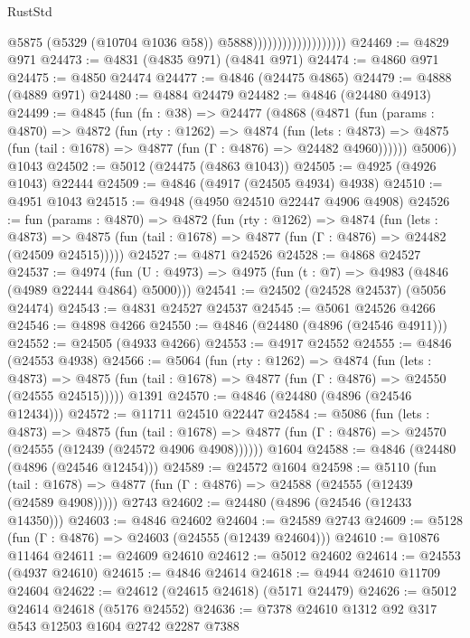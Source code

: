 \begin{lexlean}{RustStd}
\begin{coremodule}
                                          @5875
                                          (@5329 (@10704 @1036 @58))
                                          @5888)))))))))))))))))))
@24469 := @4829 @971
@24473 := @4831 (@4835 @971) (@4841 @971)
@24474 := @4860 @971
@24475 := @4850 @24474
@24477 := @4846 (@24475 @4865)
@24479 := @4888 (@4889 @971)
@24480 := @4884 @24479
@24482 := @4846 (@24480 @4913)
@24499 := @4845
    (fun (fn : @38) =>
    @24477
      (@4868
        (@4871
          (fun (params : @4870) =>
          @4872
            (fun (rty : @1262) =>
            @4874
              (fun (lets : @4873) =>
              @4875 (fun (tail : @1678) => @4877 (fun (Γ : @4876) => @24482 @4960))))))
        @5006))
    @1043
@24502 := @5012 (@24475 (@4863 @1043))
@24505 := @4925 (@4926 @1043) @22444
@24509 := @4846 (@4917 (@24505 @4934) @4938)
@24510 := @4951 @1043
@24515 := @4948 (@4950 @24510 @22447 @4906 @4908)
@24526 := fun (params : @4870) =>
  @4872
    (fun (rty : @1262) =>
    @4874
      (fun (lets : @4873) =>
      @4875 (fun (tail : @1678) => @4877 (fun (Γ : @4876) => @24482 (@24509 @24515)))))
@24527 := @4871 @24526
@24528 := @4868 @24527
@24537 := @4974
    (fun (U : @4973) => @4975 (fun (t : @7) => @4983 (@4846 (@4989 @22444 @4864) @5000)))
@24541 := @24502 (@24528 @24537) (@5056 @24474)
@24543 := @4831 @24527 @24537
@24545 := @5061 @24526 @4266
@24546 := @4898 @4266
@24550 := @4846 (@24480 (@4896 (@24546 @4911)))
@24552 := @24505 (@4933 @4266)
@24553 := @4917 @24552
@24555 := @4846 (@24553 @4938)
@24566 := @5064
    (fun (rty : @1262) =>
    @4874
      (fun (lets : @4873) =>
      @4875 (fun (tail : @1678) => @4877 (fun (Γ : @4876) => @24550 (@24555 @24515)))))
    @1391
@24570 := @4846 (@24480 (@4896 (@24546 @12434)))
@24572 := @11711 @24510 @22447
@24584 := @5086
    (fun (lets : @4873) =>
    @4875
      (fun (tail : @1678) =>
      @4877 (fun (Γ : @4876) => @24570 (@24555 (@12439 (@24572 @4906 @4908))))))
    @1604
@24588 := @4846 (@24480 (@4896 (@24546 @12454)))
@24589 := @24572 @1604
@24598 := @5110
    (fun (tail : @1678) => @4877 (fun (Γ : @4876) => @24588 (@24555 (@12439 (@24589 @4908)))))
    @2743
@24602 := @24480 (@4896 (@24546 (@12433 @14350)))
@24603 := @4846 @24602
@24604 := @24589 @2743
@24609 := @5128 (fun (Γ : @4876) => @24603 (@24555 (@12439 @24604)))
@24610 := @10876 @11464
@24611 := @24609 @24610
@24612 := @5012 @24602
@24614 := @24553 (@4937 @24610)
@24615 := @4846 @24614
@24618 := @4944 @24610 @11709 @24604
@24622 := @24612 (@24615 @24618) (@5171 @24479)
@24626 := @5012 @24614 @24618 (@5176 @24552)
@24636 := @7378 @24610 @1312 @92 @317 @543 @12503 @1604 @2742 @2287 @7388

\end{coremodule}
\end{lexlean}
